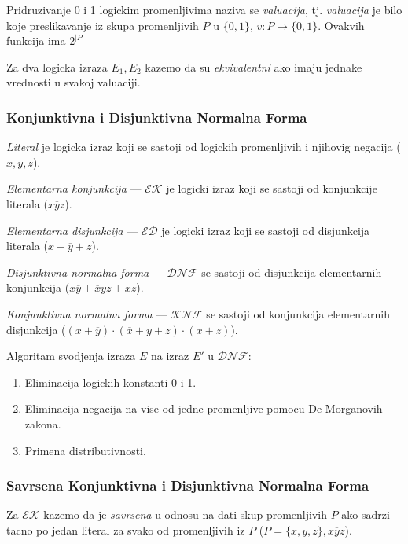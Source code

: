 \documentclass[12p,a4paper]{article}
\begin{document}
\begin{multicols}{2}
    Pridruzivanje 0 i 1 logickim promenljivima naziva se \emph{valuacija}, tj.
    \emph{valuacija} je bilo koje preslikavanje iz skupa promenljivih $P$ u 
    $\{0, 1\}$, $v: P \mapsto \{0, 1\}$. Ovakvih funkcija ima $2^{|P|}$

    Za dva logicka izraza $E_1, E_2$ kazemo da su \emph{ekvivalentni} ako 
    imaju jednake vrednosti u svakoj valuaciji.

    \subsubsection{Konjunktivna i Disjunktivna Normalna Forma}

    \emph{Literal} je logicka izraz koji se sastoji od logickih promenljivih 
    i njihovig negacija ($x, \overline{y}, z$).
    
    \emph{Elementarna konjunkcija} --- $\mathcal{EK}$ je logicki izraz koji se 
    sastoji od konjunkcije literala ($x \overline{y} z$).

    \emph{Elementarna disjunkcija} --- $\mathcal{ED}$ je logicki izraz koji se
    sastoji od disjunkcija literala ($ x + \overline{y} + z$).

    \emph{Disjunktivna normalna forma} --- $\mathcal{DNF}$ se sastoji od 
    disjunkcija elementarnih konjunkcija 
    ($x \overline{y} + \overline{x} y z + x z$).

    \emph{Konjunktivna normalna forma} --- $\mathcal{KNF}$ se sastoji od 
    konjunkcija elementarnih disjunkcija
    ($(x + \overline{y} ) \cdot (\overline{x} + y + z) \cdot (x + z)$).

    Algoritam svodjenja izraza $E$ na izraz $E'$ u $\mathcal{DNF}$:
    \begin{enumerate}
        \itemsep0em
        \item Eliminacija logickih konstanti 0 i 1.
        \item Eliminacija negacija na vise od jedne promenljive pomocu 
              De-Morganovih zakona.
        \item Primena distributivnosti.
    \end{enumerate}

    \subsubsection{Savrsena Konjunktivna i Disjunktivna Normalna Forma}

    Za $\mathcal{EK}$ kazemo da je \emph{savrsena} u odnosu na dati skup
    promenljivih $P$ ako sadrzi tacno po jedan literal za svako od 
    promenljivih iz $P$ ($P = \{x, y, z\}, x \overline{y} z$).


\end{multicols}
\end{document}
